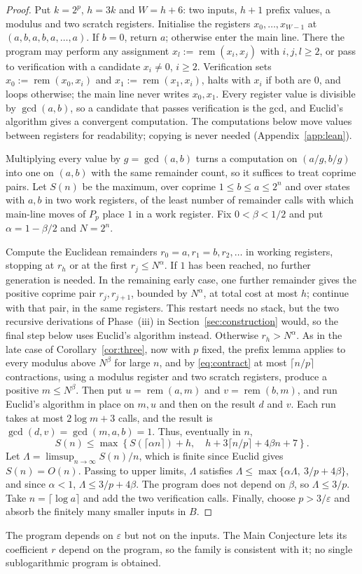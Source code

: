 \documentclass[11pt]{article}
\theoremstyle{remark}
\newcommand{\rem}{\operatorname{rem}}
\begin{document}
\begin{proof}
Put $k=2^p$, $h=3k$ and $W=h+6$: two inputs, $h+1$ prefix values, a
modulus and two scratch registers. Initialise the registers
$x_0,\ldots,x_{W-1}$ at $(a,b,a,b,a,\ldots,a)$. If $b=0$, return $a$;
otherwise enter the main line. There the program
may perform any assignment $x_l:=\rem(x_i,x_j)$ with $i,j,l\geq2$, or pass to
verification with a candidate $x_i\neq0$, $i\geq2$. Verification sets
$x_0:=\rem(x_0,x_i)$ and $x_1:=\rem(x_1,x_i)$, halts with $x_i$ if both are
$0$, and loops otherwise; the main line never writes $x_0,x_1$. Every register value is
divisible by $\gcd(a,b)$, so a candidate that passes verification is the
gcd, and Euclid's algorithm gives a convergent computation. The computations
below move values between registers for readability; copying is never needed
(Appendix~\ref{app:lean}).

Multiplying every value by $g=\gcd(a,b)$ turns a computation on
$(a/g,b/g)$ into one on $(a,b)$ with the same remainder count, so it
suffices to treat coprime pairs. Let $S(n)$ be the maximum, over coprime
$1\leq b\leq a\leq2^n$ and over states with $a,b$ in two work registers,
of the least number of remainder calls with which main-line moves of $P_p$
place $1$ in a work register. Fix $0<\beta<1/2$ and put $\alpha=1-\beta/2$ and $N=2^n$.

Compute the Euclidean remainders $r_0=a,r_1=b,r_2,\ldots$ in working
registers, stopping at $r_h$ or at the first $r_j\leq N^\alpha$.
If $1$ has been reached, no further generation is needed. In the remaining early case,
one further remainder gives the positive coprime pair $r_j,r_{j+1}$,
bounded by $N^\alpha$, at total cost at most $h$; continue with that pair,
in the same registers. This restart needs no stack, but the two recursive
derivations of Phase~(iii) in Section~\ref{sec:construction} would, so the
final step below uses Euclid's algorithm instead.
Otherwise $r_h>N^\alpha$. As in the late case of Corollary~\ref{cor:three}, now
with $p$ fixed, the prefix lemma applies to every modulus above $N^\beta$
for large $n$, and by \eqref{eq:contract} at
most $\lceil n/p\rceil$ contractions, using a modulus register and two
scratch registers, produce a positive $m\leq N^\beta$. Then put
$u=\rem(a,m)$ and $v=\rem(b,m)$, and run Euclid's algorithm in place on $m,u$
and then on the result $d$ and $v$. Each run takes at most $2\log m+3$
calls, and the result is $\gcd(d,v)=\gcd(m,a,b)=1$. Thus, eventually in $n$,
\[
S(n)\leq\max\left\{S(\lceil\alpha n\rceil)+h,\quad
 h+3\lceil n/p\rceil+4\beta n+7\right\}.
\]
Let $\Lambda=\limsup_{n\to\infty}S(n)/n$, which is finite since Euclid gives
$S(n)=O(n)$. Passing to upper limits, $\Lambda$ satisfies
$\Lambda\leq\max\{\alpha\Lambda,\ 3/p+4\beta\}$, and since $\alpha<1$,
$\Lambda\leq3/p+4\beta$. The program does not depend on $\beta$, so
$\Lambda\leq3/p$. Take $n=\lceil\log a\rceil$ and add the two verification
calls. Finally, choose $p>3/\varepsilon$ and absorb the finitely many
smaller inputs in $B$.
\end{proof}
The program depends on $\varepsilon$ but not on the inputs. The Main
Conjecture lets its coefficient $r$ depend on the program, so the family is
consistent with it; no single sublogarithmic program is obtained.
\end{document}

